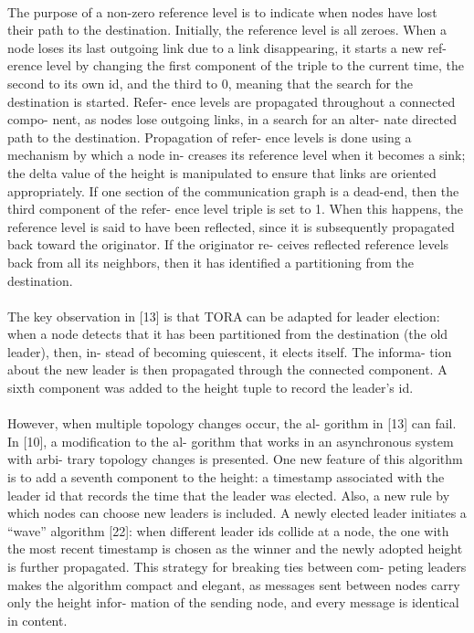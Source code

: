 \documentclass{article}
\begin{document}
\paragraph{}The purpose of a non-zero reference level is to indicate
when nodes have lost their path to the destination. Initially,
the reference level is all zeroes. When a node loses its last
outgoing link due to a link disappearing, it starts a new ref-
erence level by changing the first component of the triple to
the current time, the second to its own id, and the third to 0,
meaning that the search for the destination is started. Refer-
ence levels are propagated throughout a connected compo-
nent, as nodes lose outgoing links, in a search for an alter-
nate directed path to the destination. Propagation of refer-
ence levels is done using a mechanism by which a node in-
creases its reference level when it becomes a sink; the delta
value of the height is manipulated to ensure that links are
oriented appropriately. If one section of the communication
graph is a dead-end, then the third component of the refer-
ence level triple is set to 1. When this happens, the reference
level is said to have been reflected, since it is subsequently
propagated back toward the originator. If the originator re-
ceives reflected reference levels back from all its neighbors,
then it has identified a partitioning from the destination.

\paragraph{}The key observation in [13] is that TORA can be adapted
for leader election: when a node detects that it has been
partitioned from the destination (the old leader), then, in-
stead of becoming quiescent, it elects itself. The informa-
tion about the new leader is then propagated through the
connected component. A sixth component was added to the
height tuple to record the leader’s id.

\paragraph{}However, when multiple topology changes occur, the al-
gorithm in [13] can fail. In [10], a modification to the al-
gorithm that works in an asynchronous system with arbi-
trary topology changes is presented. One new feature of
this algorithm is to add a seventh component to the height: a
timestamp associated with the leader id that records the time
that the leader was elected. Also, a new rule by which nodes
can choose new leaders is included. A newly elected leader
initiates a “wave” algorithm [22]: when different leader ids
collide at a node, the one with the most recent timestamp is
chosen as the winner and the newly adopted height is further
propagated. This strategy for breaking ties between com-
peting leaders makes the algorithm compact and elegant, as
messages sent between nodes carry only the height infor-
mation of the sending node, and every message is identical
in content.
\end{document}
